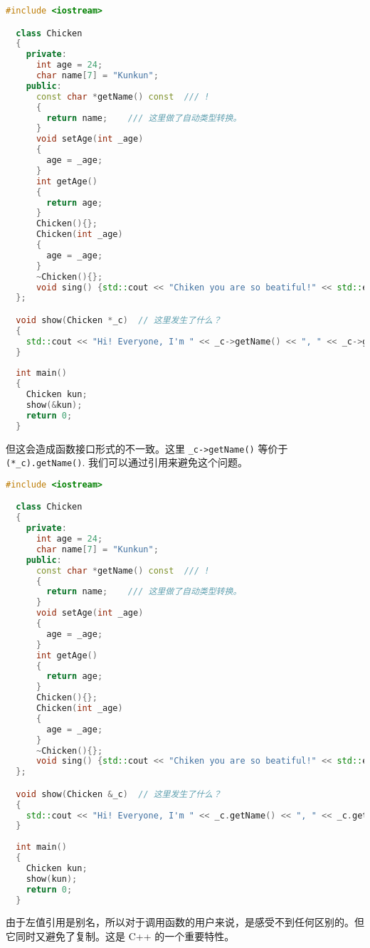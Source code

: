 \documentclass[a4paper]{ctexart}
\theoremstyle{definition}
\theoremstyle{definition}
\begin{document}
\begin{lstlisting}[language=C++]
  #include <iostream>

  class Chicken
  {
    private:
      int age = 24;
      char name[7] = "Kunkun";
    public:
      const char *getName() const  /// !
      {
        return name;    /// 这里做了自动类型转换。
      }
      void setAge(int _age)
      {
        age = _age;
      }
      int getAge()
      {
        return age;
      }
      Chicken(){};
      Chicken(int _age)
      {
        age = _age;
      }
      ~Chicken(){};
      void sing() {std::cout << "Chiken you are so beatiful!" << std::endl;}      
  };

  void show(Chicken *_c)  // 这里发生了什么？
  {
    std::cout << "Hi! Everyone, I'm " << _c->getName() << ", " << _c->getAge() << " years old." << std::endl;
  }
  
  int main()
  {
    Chicken kun;
    show(&kun);
    return 0;
  }
\end{lstlisting}

但这会造成函数接口形式的不一致。这里 \verb|_c->getName()| 等价于 \verb|(*_c).getName()|. 我们可以通过引用来避免这个问题。

\begin{lstlisting}[language=C++]
  #include <iostream>

  class Chicken
  {
    private:
      int age = 24;
      char name[7] = "Kunkun";
    public:
      const char *getName() const  /// !
      {
        return name;    /// 这里做了自动类型转换。
      }
      void setAge(int _age)
      {
        age = _age;
      }
      int getAge()
      {
        return age;
      }
      Chicken(){};
      Chicken(int _age)
      {
        age = _age;
      }
      ~Chicken(){};
      void sing() {std::cout << "Chiken you are so beatiful!" << std::endl;}      
  };

  void show(Chicken &_c)  // 这里发生了什么？
  {
    std::cout << "Hi! Everyone, I'm " << _c.getName() << ", " << _c.getAge() << " years old." << std::endl;
  }
  
  int main()
  {
    Chicken kun;
    show(kun);
    return 0;
  }
\end{lstlisting}

由于左值引用是别名，所以对于调用函数的用户来说，是感受不到任何区别的。但它同时又避免了复制。这是 C++ 的一个重要特性。
\end{document}
